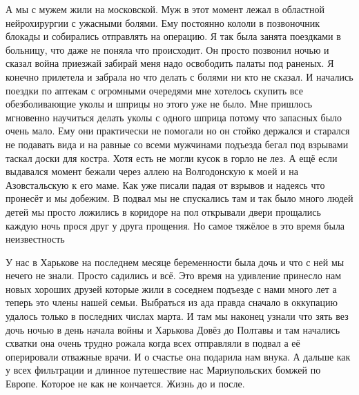 А мы с мужем жили на московской. Муж в этот момент лежал в областной
нейрохирургии с ужасными болями. Ему постоянно кололи в позвоночник блокады и
собирались отправлять на операцию. Я так была занята поездками в больницу, что
даже не поняла что происходит. Он просто позвонил ночью и сказал война приезжай
забирай меня надо освободить палаты под раненых. Я конечно прилетела и забрала
но что делать с болями ни кто не сказал. И начались поездки по аптекам с
огромными очередями мне хотелось скупить все обезболивающие уколы и шприцы но
этого уже не было. Мне пришлось мгновенно научиться делать уколы с одного
шприца потому что запасных было очень мало. Ему они практически не помогали но
он стойко держался и старался не подавать вида и на равные со всеми мужчинами
подъезда бегал под взрывами таскал доски для костра. Хотя есть не могли кусок в
горло не лез. А ещё если выдавался момент бежали через аллею на Волгодонскую к
моей и на Азовстальскую к его маме. Как уже писали падая от взрывов и надеясь
что пронесёт и мы добежим. В подвал мы не спускались там и так было много людей
детей мы просто ложились в коридоре на пол открывали двери прощались каждую
ночь прося друг у друга прощения. Но самое тяжёлое в это время была
неизвестность

У нас в Харькове на последнем месяце беременности была дочь и что с ней мы
нечего не знали. Просто садились и всё. Это время на удивление принесло нам
новых хороших друзей которые жили в соседнем подъезде с нами много лет а теперь
это члены нашей семьи. Выбраться из ада правда сначало в оккупацию удалось
только в последних числах марта. И там мы наконец узнали что зять вез дочь
ночью в день начала войны и Харькова Довёз до Полтавы и там начались схватки
она очень трудно рожала когда всех отправляли в подвал а её оперировали
отважные врачи. И о счастье она подарила нам внука. А дальше как у всех
фильтрации и длинное путешествие нас Мариупольских бомжей по Европе. Которое не
как не кончается. Жизнь до и после.
